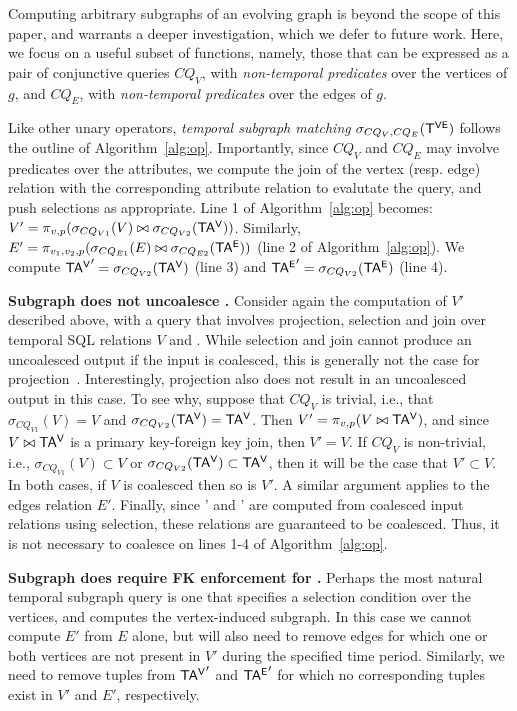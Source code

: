 Computing arbitrary subgraphs of an evolving graph is beyond the scope
of this paper, and warrants a deeper investigation, which we defer to
future work. Here, we focus on a useful subset of functions, namely,
those that can be expressed as a pair of conjunctive queries $CQ_V$,
with {\em non-temporal predicates} over the vertices of $g$, and
$CQ_E$, with {\em non-temporal predicates} over the edges of $g$.

Like other unary operators, {\em temporal subgraph matching}
$\sigma_{CQ_V, CQ_E} (\mathsf{T^{VE}})$ follows the outline of
Algorithm~\ref{alg:op}.  Importantly, since $CQ_V$ and $CQ_E$ may
involve predicates over the attributes, we compute the join of the
vertex (resp. edge) relation with the corresponding attribute
relation to evalutate the query, and push selections as appropriate.
Line 1 of Algorithm~\ref{alg:op} becomes: $V' = \pi_{v,p}
(\sigma_{CQ_{V1}} (V) \bowtie \sigma_{CQ_{V2}} (\mathsf{TA^{V}}))$.  Similarly,
$E' = \pi_{v_1,v_2,p} (\sigma_{CQ_{E1}} (E) \bowtie \sigma_{CQ_{E2}}
(\mathsf{TA^{E}}))$ (line 2 of Algorithm~\ref{alg:op}).  We compute $\mathsf{TA^{V}}' =
\sigma_{CQ_{V2}} (\mathsf{TA^{V}})$ (line 3) and $\mathsf{TA^{E}}' = \sigma_{CQ_{V2}}
(\mathsf{TA^{E}})$ (line 4).

{\bf Subgraph does not uncoalesce \tve.}%
Consider again the computation of $V'$ described above, with a query
that involves projection, selection and join over temporal SQL
relations $V$ and \tav.  While selection and join cannot produce an
uncoalesced output if the input is coalesced, this is generally not
the case for projection~\cite{DBLP:conf/vldb/BohlenSS96}.
Interestingly, projection also does not result in an uncoalesced
output in this case. To see why, suppose that $CQ_V$ is trivial, i.e.,
that $\sigma_{CQ_{V1}} (V) = V$ and $\sigma_{CQ_{V2}} (\mathsf{TA^{V}}) =
\mathsf{TA^{V}}$. Then $V' = \pi_{v,p} (V \bowtie \mathsf{TA^{V}})$, and since $V \bowtie
\mathsf{TA^{V}}$ is a primary key-foreign key join, then $V' = V$.  If $CQ_V$ is
non-trivial, i.e., $\sigma_{CQ_{V1}} (V) \subset V$ or
$\sigma_{CQ_{V2}} (\mathsf{TA^{V}}) \subset \mathsf{TA^{V}}$, then it will be the case that
$V' \subset V$.  In both cases, if $V$ is coalesced then so is $V'$.
A similar argument applies to the edges relation $E'$.  Finally, since
\tav' and \tae' are computed from coalesced input relations using
selection, these relations are guaranteed to be coalesced.  Thus, it
is not necessary to coalesce on lines 1-4 of Algorithm~\ref{alg:op}.

{\bf Subgraph does require FK enforcement for \tve.}  Perhaps the most
natural temporal subgraph query is one that specifies a selection
condition over the vertices, and computes the vertex-induced subgraph.
In this case we cannot compute $E'$ from $E$ alone, but will also need
to remove edges for which one or both vertices are not present in $V'$
during the specified time period.  Similarly, we need to remove tuples
from $\mathsf{TA^{V}}'$ and $\mathsf{TA^{E}}'$ for which no corresponding tuples exist in
$V'$ and $E'$, respectively.

